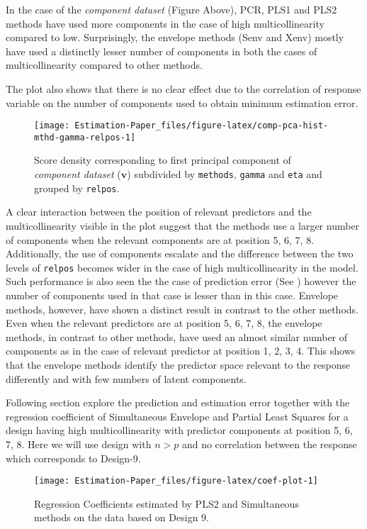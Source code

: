 \documentclass[12pt,3p,authoryear]{elsarticle}
\begin{document}
In the case of the \emph{component dataset} (Figure Above), PCR, PLS1
and PLS2 methods have used more components in the case of high
multicollinearity compared to low. Surprisingly, the envelope methods
(Senv and Xenv) mostly have used a distinctly lesser number of
components in both the cases of multicollinearity compared to other
methods.

The plot also shows that there is no clear effect due to the correlation
of response variable on the number of components used to obtain minimum
estimation error.

\begin{figure}[!htb]
\texttt{[image: Estimation-Paper\_files/figure-latex/comp-pca-hist-mthd-gamma-relpos-1]} \caption{Score density corresponding to first principal component
of \emph{component dataset} (\(\mathbf{v}\)) subdivided by
\texttt{methods}, \texttt{gamma} and \texttt{eta} and grouped by
\texttt{relpos}.}\label{fig:comp-pca-hist-mthd-gamma-relpos}
\end{figure}

A clear interaction between the position of relevant predictors and the
multicollinearity visible in the plot suggest that the methods use a
larger number of components when the relevant components are at position
5, 6, 7, 8. Additionally, the use of components escalate and the
difference between the two levels of \texttt{relpos} becomes wider in
the case of high multicollinearity in the model. Such performance is
also seen the the case of prediction error (See \citet{rimal2019pred})
however the number of components used in that case is lesser than in
this case. Envelope methods, however, have shown a distinct result in
contrast to the other methods. Even when the relevant predictors are at
position 5, 6, 7, 8, the envelope methods, in contrast to other methods,
have used an almost similar number of components as in the case of
relevant predictor at position 1, 2, 3, 4. This shows that the envelope
methods identify the predictor space relevant to the response
differently and with few numbers of latent components.

Following section explore the prediction and estimation error together
with the regression coefficient of Simultaneous Envelope and Partial
Least Squares for a design having high multicollinearity with predictor
components at position 5, 6, 7, 8. Here we will use design with \(n>p\)
and no correlation between the response which corresponds to Design-9.

\begin{figure}
\texttt{[image: Estimation-Paper\_files/figure-latex/coef-plot-1]} \caption{Regression Coefficients estimated by PLS2 and Simultaneous methods on the data based on Design 9.}\label{fig:coef-plot}
\end{figure}
\end{document}
